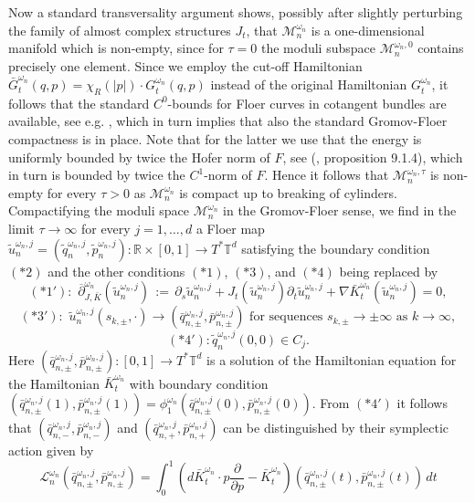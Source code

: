 \documentclass[a4paper,11pt]{amsart}
\newcommand{\RR}{\mathbb{R}}
\newcommand{\TT}{\mathbb{T}}
\begin{document}
\indent Now a standard transversality argument shows, possibly after slightly perturbing the family of almost complex structures $J_t$, that $\mathcal{M}_n^{\omega_n}$ is a one-dimensional manifold which is non-empty, since for $\tau=0$ the moduli subspace $\mathcal{M}_n^{\omega_n,0}$ contains precisely one element. Since we employ the cut-off Hamiltonian $\bar{G}_t^{\omega_n}(q,p)=\chi_R(|p|)\cdot G_t^{\omega_n}(q,p)$ instead of the original Hamiltonian $G_t^{\omega_n}$, it follows that the standard $C^0$-bounds for Floer curves in cotangent bundles are available, see e.g. \cite{C}, which in turn implies that also the standard Gromov-Floer compactness is in place. Note that for the latter we use that the energy is uniformly bounded by twice the Hofer norm of $F$, see (\cite{MDSa}, proposition 9.1.4), which in turn is bounded by twice the $C^1$-norm of $F$. Hence it follows that $\mathcal{M}_n^{\omega_n,\tau}$ is non-empty for every $\tau>0$ as $\mathcal{M}_n^{\omega_n}$ is compact up to breaking of cylinders. Compactifying the moduli space $\mathcal{M}_n^{\omega_n}$ in the Gromov-Floer sense, we find in the limit $\tau\to\infty$ for every $j=1,\ldots,d$ a Floer map $\widetilde{u}^{\omega_n,j}_n=(\widetilde{q}^{\omega_n,j}_n,\widetilde{p}^{\omega_n,j}_n):\RR\times [0,1]\to T^*\TT^d$ satisfying the boundary condition $(*2)$ and the other conditions $(*1)$, $(*3)$, and $(*4)$ being replaced by 
\[(*1'):\,\, \overline{\partial}^{\omega_n}_{J,\bar{K}}(\widetilde{u}^{\omega_n,j}_n)\,:=\,\partial_s\widetilde{u}^{\omega_n,j}_n+J_t(\widetilde{u}^{\omega_n,j}_n)\partial_t\widetilde{u}^{\omega_n,j}_n+\nabla \bar{K}^{\omega_n}_t(\widetilde{u}^{\omega_n,j}_n)=0,\]
\[(*3'):\,\,\widetilde{u}^{\omega_n,j}_n(s_{k,\pm},\cdot)\to(\bar{q}^{\omega_n,j}_{n,\pm},\bar{p}^{\omega_n,j}_{n,\pm})\,\,\textrm{for sequences}\,\,s_{k,\pm}\to\pm\infty\,\,\textrm{as}\,\,k\to\infty ,\]
\[(*4'): \widetilde{q}^{\omega_n,j}_n(0,0)\in C_j.\]
Here $(\bar{q}^{\omega_n,j}_{n,\pm},\bar{p}^{\omega_n,j}_{n,\pm}):[0,1]\to T^*\TT^d$ is a solution of the Hamiltonian equation for the Hamiltonian $\bar{K}^{\omega_n}_t$ with boundary condition $(\bar{q}^{\omega_n,j}_{n,\pm}(1),\bar{p}^{\omega_n,j}_{n,\pm}(1))=\phi^{\omega_n}_1(\bar{q}^{\omega_n,j}_{n,\pm}(0),\bar{p}^{\omega_n,j}_{n,\pm}(0))$. From $(*4')$ it follows that $(\bar{q}^{\omega_n,j}_{n,-},\bar{p}^{\omega_n,j}_{n,-})$ and $(\bar{q}^{\omega_n,j}_{n,+},\bar{p}^{\omega_n,j}_{n,+})$ can be distinguished by their symplectic action given by \[\mathcal{L}_n^{\omega_n}(\bar{q}^{\omega_n,j}_{n,\pm},\bar{p}^{\omega_n,j}_{n,\pm})=\int_0^1 \left( d\bar{K}^{\omega_n}_t\cdot p\frac{\partial}{\partial p}-\bar{K}^{\omega_n}_t\right)(\bar{q}^{\omega_n,j}_{n,\pm}(t),\bar{p}^{\omega_n,j}_{n,\pm}(t))\,dt\] 
\end{document}

